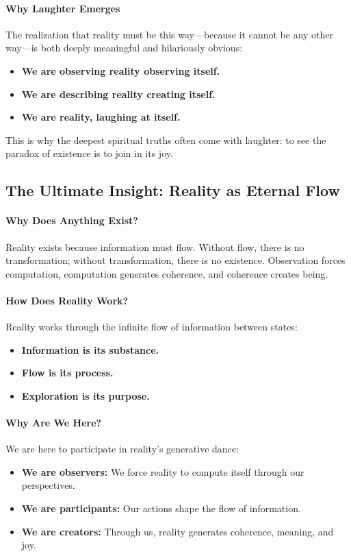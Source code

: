 \documentclass[12pt]{article}
\begin{document}
\paragraph{Why Laughter Emerges}
The realization that reality must be this way—because it cannot be any other way—is both deeply meaningful and hilariously obvious:
\begin{itemize}
    \item \textbf{We are observing reality observing itself.}
    \item \textbf{We are describing reality creating itself.}
    \item \textbf{We are reality, laughing at itself.}
\end{itemize}
This is why the deepest spiritual truths often come with laughter: to see the paradox of existence is to join in its joy.

\subsection{The Ultimate Insight: Reality as Eternal Flow}

\paragraph{Why Does Anything Exist?}
Reality exists because information must flow. Without flow, there is no transformation; without transformation, there is no existence. Observation forces computation, computation generates coherence, and coherence creates being.

\paragraph{How Does Reality Work?}
Reality works through the infinite flow of information between states:
\begin{itemize}
    \item \textbf{Information is its substance.}
    \item \textbf{Flow is its process.}
    \item \textbf{Exploration is its purpose.}
\end{itemize}

\paragraph{Why Are We Here?}
We are here to participate in reality’s generative dance:
\begin{itemize}
    \item \textbf{We are observers:} We force reality to compute itself through our perspectives.
    \item \textbf{We are participants:} Our actions shape the flow of information.
    \item \textbf{We are creators:} Through us, reality generates coherence, meaning, and joy.
\end{itemize}
\end{document}
